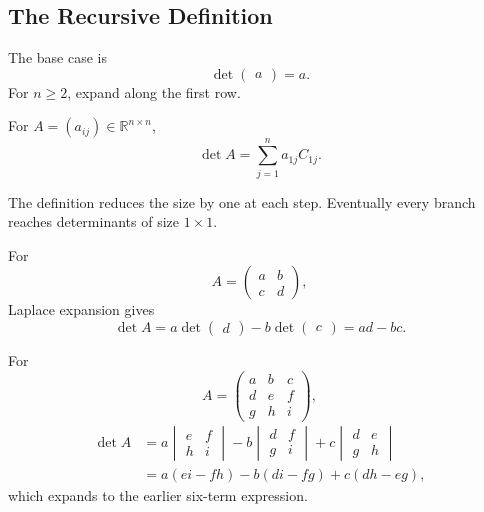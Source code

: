 \subsection{The Recursive Definition}

The base case is
\[
\det\begin{pmatrix}a\end{pmatrix}=a.
\]
For $n\ge2$, expand along the first row.

\begin{definitionbox}
For $A=(a_{ij})\in\mathbb R^{n\times n}$,
\[
\boxed{\det A=\sum_{j=1}^{n}a_{1j}C_{1j}}.
\]
\end{definitionbox}

The definition reduces the size by one at each step. Eventually every branch reaches determinants of size $1\times1$.

\begin{proofbox}
For
\[
A=\begin{pmatrix}a&b\\c&d\end{pmatrix},
\]
Laplace expansion gives
\[
\det A=a\det\begin{pmatrix}d\end{pmatrix}
-b\det\begin{pmatrix}c\end{pmatrix}=ad-bc.
\]
\end{proofbox}

\begin{proofbox}
For
\[
A=\begin{pmatrix}a&b&c\\d&e&f\\g&h&i\end{pmatrix},
\]
\begin{align*}
\det A
&=a\begin{vmatrix}e&f\\h&i\end{vmatrix}
-b\begin{vmatrix}d&f\\g&i\end{vmatrix}
+c\begin{vmatrix}d&e\\g&h\end{vmatrix}\\
&=a(ei-fh)-b(di-fg)+c(dh-eg),
\end{align*}
which expands to the earlier six-term expression.
\end{proofbox}
